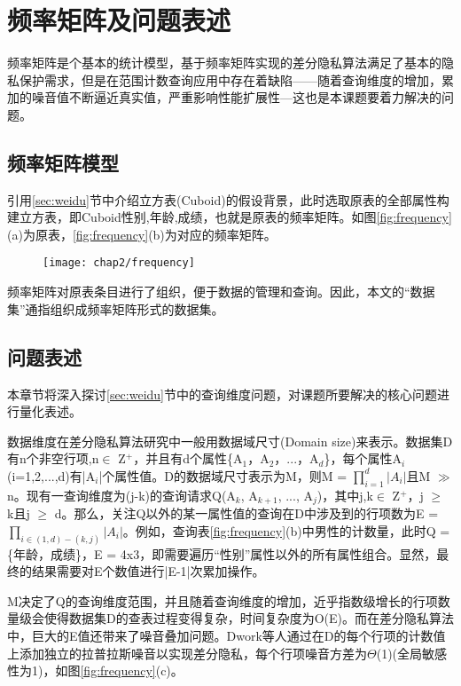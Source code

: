 \section{频率矩阵及问题表述}

频率矩阵是个基本的统计模型，基于频率矩阵实现的差分隐私算法满足了基本的隐私保护需求，但是在范围计数查询应用中存在着缺陷——随着查询维度的增加，累加的噪音值不断逼近真实值，严重影响性能扩展性---这也是本课题要着力解决的问题。

\subsection{频率矩阵模型}

引用\ref{sec:weidu}节中介绍立方表(Cuboid)的假设背景，此时选取原表的全部属性构建立方表，即Cuboid{性别,年龄,成绩}，也就是原表的频率矩阵。如图\ref{fig:frequency}(a)为原表，\ref{fig:frequency}(b)为对应的频率矩阵。

\begin{figure}[!htp]
	\centering
	\texttt{[image: chap2/frequency]}
\end{figure}

频率矩阵对原表条目进行了组织，便于数据的管理和查询。因此，本文的“数据集”通指组织成频率矩阵形式的数据集。

\subsection{问题表述}

本章节将深入探讨\ref{sec:weidu}节中的查询维度问题，对课题所要解决的核心问题进行量化表述。

数据维度在差分隐私算法研究中一般用数据域尺寸(Domain size)来表示。数据集D有n个非空行项,n$\in$ Z$^{+}$，并且有d个属性\{A$_{1}$，A$_{2}$，...，A$_{d}$\}，每个属性A$_{i}$(i=1,2,...,d)有|A$_{i}$|个属性值。D的数据域尺寸表示为M，则M = \(\prod\limits_{i = 1}^d {|A{_i} |}\)且M $\gg$ n。现有一查询维度为(j-k)的查询请求Q(A$_{k}$, A$_{k+1}$, ..., A$_{j}$)，其中j,k$\in$ Z$^{+}$，j $\geqslant$ k且j $\geqslant$ d。那么，关注Q以外的某一属性值的查询在D中涉及到的行项数为E = \(\prod\nolimits_{i \in (1,d) - (k,j)} {|A{_i} |} \)。例如，查询表\ref{fig:frequency}(b)中男性的计数量，此时Q = \{年龄，成绩\}，E = 4x3，即需要遍历“性别”属性以外的所有属性组合。显然，最终的结果需要对E个数值进行|E-1|次累加操作。

M决定了Q的查询维度范围，并且随着查询维度的增加，近乎指数级增长的行项数量级会使得数据集D的查表过程变得复杂，时间复杂度为O(E)。而在差分隐私算法中，巨大的E值还带来了噪音叠加问题。Dwork\cite{Dwork Calibrating}等人通过在D的每个行项的计数值上添加独立的拉普拉斯噪音以实现差分隐私，每个行项噪音方差为$\Theta$(1)(全局敏感性为1)，如图\ref{fig:frequency}(c)。

